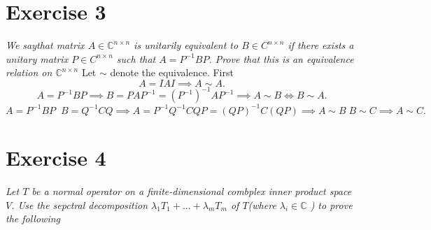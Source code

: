 \documentclass{article}
\begin{document}
    \section{Exercise 3}
    \emph{
        We saythat matrix $A \in \mathbb{C}^{n \times n}$ is unitarily equivalent to $B \in C^{n \times n}$ if
        there exists a unitary matrix $P \in C^{n \times n}$ such that $A = P^{-1}BP$. Prove that this is an equivalence relation
        on $ \mathbb{C}^{n \times n}$
    }
    Let $\sim$ denote the equivalence.
    First
    \[
    A = IAI \implies A \sim A 
    .\] 
    \[
    A = P^{-1}BP \implies B = PAP^{-1} = (P^{-1})^{-1}AP^{-1} \implies A \sim B \iff B \sim A
    .\] 
    \[
    A = P^{-1}BP \;\; B = Q^{-1}CQ \implies A = P^{-1}Q^{-1}CQP = (QP)^{-1}C(QP) \implies A \sim B \; B \sim C \implies A \sim C
    .\] 
    \section{Exercise 4}
    \emph{
        Let $T$ be a normal operator on a finite-dimensional combplex inner product space $V$.
        Use the sepctral decomposition $\lambda_1T_1 + ... + \lambda_mT_m$ of $T$(where $\lambda_i \in \mathbb{C}$ ) to prove the following
    }
\end{document}
